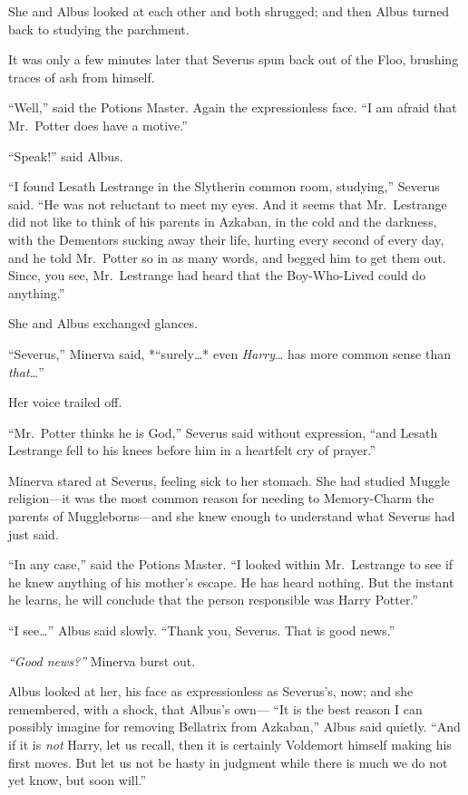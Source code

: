 She and Albus looked at each other and both shrugged; and then Albus
turned back to studying the parchment.

It was only a few minutes later that Severus spun back out of the Floo,
brushing traces of ash from himself.

``Well,'' said the Potions Master. Again the expressionless face. ``I am
afraid that Mr.~Potter does have a motive.''

``Speak!'' said Albus.

``I found Lesath Lestrange in the Slytherin common room, studying,''
Severus said. ``He was not reluctant to meet my eyes. And it seems that
Mr.~Lestrange did not like to think of his parents in Azkaban, in the
cold and the darkness, with the Dementors sucking away their life,
hurting every second of every day, and he told Mr.~Potter so in as many
words, and begged him to get them out. Since, you see, Mr.~Lestrange had
heard that the Boy-Who-Lived could do anything.''

She and Albus exchanged glances.

``Severus,'' Minerva said, *``surely\ldots{}* even \emph{Harry}\ldots{}
has more common sense than \emph{that\ldots{}}''

Her voice trailed off.

``Mr.~Potter thinks he is God,'' Severus said without expression, ``and
Lesath Lestrange fell to his knees before him in a heartfelt cry of
prayer.''

Minerva stared at Severus, feeling sick to her stomach. She had studied
Muggle religion---it was the most common reason for needing to
Memory-Charm the parents of Muggleborns---and she knew enough to
understand what Severus had just said.

``In any case,'' said the Potions Master. ``I looked within
Mr.~Lestrange to see if he knew anything of his mother's escape. He has
heard nothing. But the instant he learns, he will conclude that the
person responsible was Harry Potter.''

``I see\ldots{}'' Albus said slowly. ``Thank you, Severus. That is good
news.''

\emph{``Good news?''} Minerva burst out.

Albus looked at her, his face as expressionless as Severus's, now; and
she remembered, with a shock, that Albus's own--- ``It is the best
reason I can possibly imagine for removing Bellatrix from Azkaban,''
Albus said quietly. ``And if it is \emph{not} Harry, let us recall, then
it is certainly Voldemort himself making his first moves. But let us not
be hasty in judgment while there is much we do not yet know, but soon
will.''

